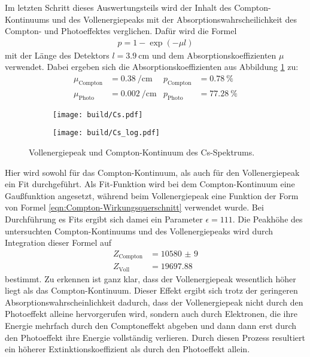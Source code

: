 Im letzten Schritt dieses Auswertungsteils wird der Inhalt des Compton-Kontinuums
und des Vollenergiepeaks mit der Absorptionswahrscheilichkeit des Compton- und
Photoeffektes verglichen. Dafür wird die Formel
\begin{align*}
	p = 1 - \exp\left(-\mu l\right)
\end{align*}
mit der Länge des Detektors $l = \SI{3.9}{\centi\meter}$ und dem
Absorptionskoeffizienten $\mu$ verwendet. Dabei ergeben sich die
Absorptionskoeffizienten aus Abbildung \ref{plt:Cs_abs} zu:
\begin{align*}
	\mu_\text{Compton} &= \SI{0.38}{\per\centi\meter} & p_\text{Compton} &= \SI{0.78}{\percent} \\
	\mu_\text{Photo} &= \SI{0.002}{\per\centi\meter} & p_\text{Photo} &= \SI{77.28}{\percent}
\end{align*}
\begin{figure}
  \begin{subfigure}{0.49\textwidth}
    \centering
    \texttt{[image: build/Cs.pdf]}
  \end{subfigure}
  \begin{subfigure}{0.49\textwidth}
    \centering
    \texttt{[image: build/Cs\_log.pdf]}
  \end{subfigure}
  \caption{Vollenergiepeak und Compton-Kontinuum des Cs-Spektrums.}
  \label{plt:Cs_abs}
\end{figure}
Hier wird sowohl für das Compton-Kontinuum, als auch für den Vollenergiepeak ein
Fit durchgeführt. Als Fit-Funktion wird bei dem Compton-Kontinuum eine
Gaußfunktion angesetzt, während beim Vollenergiepeak eine Funktion der Form von
Formel \eqref{eqn:Compton-Wirkungsquerschnitt} verwendet wurde. Bei Durchführung
es Fits ergibt sich damei ein Parameter $\epsilon = \num{111}$. Die Peakhöhe des
untersuchten Compton-Kontinuums und des Vollenergiepeaks wird durch
Integration dieser Formel auf
\begin{align*}
  Z_\text{Compton} &= \num{10580(9)} \\
  Z_\text{Voll} &= \num{19697.88}
\end{align*}
bestimmt.
Zu erkennen ist ganz klar, dass der Vollenergiepeak wesentlich höher liegt als
das Compton-Kontinuum. Dieser Effekt ergibt sich trotz der geringeren
Absorptionswahrscheinlichkeit dadurch, dass der Vollenergiepeak nicht durch den
Photoeffekt alleine hervorgerufen wird, sondern auch durch Elektronen, die ihre
Energie mehrfach durch den Comptoneffekt abgeben und dann dann erst durch den
Photoeffekt ihre Energie vollständig verlieren. Durch diesen Prozess resultiert
ein höherer Extinktionskoeffizient als durch den Photoeffekt allein.

